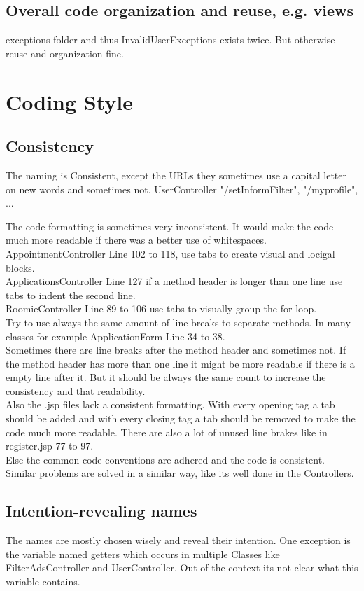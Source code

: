 \documentclass{scrreprt}
\begin{document}
\subsection{Overall code organization and reuse, e.g. views}
exceptions folder and thus InvalidUserExceptions exists twice. But otherwise reuse and organization fine.

\section{Coding Style}

\subsection{Consistency}
The naming is Consistent, except the URLs they sometimes use a capital letter on new words and sometimes not. UserController "/setInformFilter", "/myprofile", ... 

The code formatting is sometimes very inconsistent. It would make the code much more readable if there was a better use of whitespaces. 
AppointmentController Line 102 to 118, use tabs to create visual and locigal blocks.\\
ApplicationsController Line 127 if a method header is longer than one line use tabs to indent the second line. \\
RoomieController Line 89 to 106 use tabs to visually group the for loop.\\
Try to use always the same amount of line breaks to separate methods. In many classes for example ApplicationForm Line 34 to 38.\\
Sometimes there are line breaks after the method header and sometimes not. If the method header has more than one line it might be more readable if there is a empty line after it. But it should be always the same count to increase the consistency and that readability.\\
Also the .jsp files lack a consistent formatting. With every opening tag a tab should be added and with every closing tag a tab should be removed to make the code much more readable. There are also a lot of unused line brakes like in register.jsp 77 to 97. \\

Else the common code conventions are adhered and the code is consistent. Similar problems are solved in a similar way, like its well done in the Controllers. 

\subsection{Intention-revealing names}
The names are mostly chosen wisely and reveal their intention.  One exception is the variable named getters which occurs in multiple Classes like FilterAdsController and UserController. Out of the context its not clear what this variable contains. 
\end{document}
